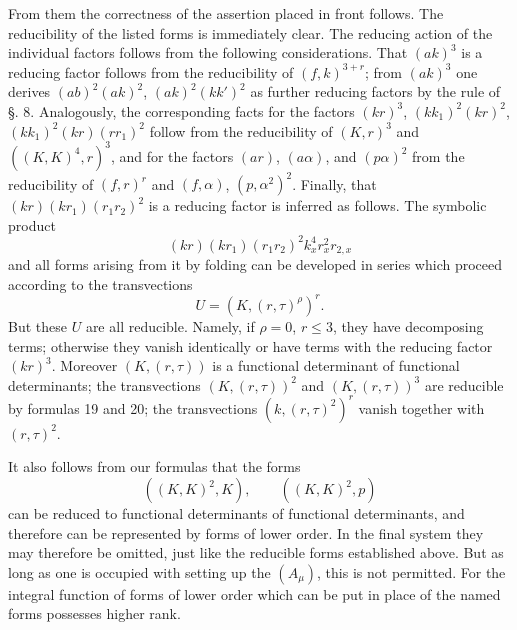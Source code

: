 \documentclass[10pt]{article}
\begin{document}
From them the correctness of the assertion placed in front follows. The reducibility of the listed forms is immediately clear. The reducing action of the individual factors follows from the following considerations. That $(ak)^3$ is a reducing factor follows from the reducibility of $(f,k)^{3+r}$; from $(ak)^3$ one derives $(ab)^2(ak)^2$, $(ak)^2(kk')^2$ as further reducing factors by the rule of §. 8. Analogously, the corresponding facts for the factors $(kr)^3$, $(kk_1)^2(kr)^2$, $(kk_1)^2(kr)(rr_1)^2$ follow from the reducibility of $(K,r)^3$ and $((K,K)^4,r)^3$, and for the factors $(ar)$, $(a\alpha)$, and $(p\alpha)^2$ from the reducibility of $(f,r)^r$ and $(f,\alpha)$, $(p,\alpha^2)^2$. Finally, that $(kr)(kr_1)(r_1r_2)^2$ is a reducing factor is inferred as follows. The symbolic product
\[
(kr)(kr_1)(r_1r_2)^2k_x^4r_x^2r_{2,x}
\]
and all forms arising from it by folding can be developed in series which proceed according to the transvections
\[
U=(K,(r,\tau)^\rho)^r.
\]
But these $U$ are all reducible. Namely, if $\rho=0$, $r\leq3$, they have decomposing terms; otherwise they vanish identically or have terms with the reducing factor $(kr)^3$. Moreover $(K,(r,\tau))$ is a functional determinant of functional determinants; the transvections $(K,(r,\tau))^2$ and $(K,(r,\tau))^3$ are reducible by formulas 19 and 20; the transvections $(k,(r,\tau)^2)^r$ vanish together with $(r,\tau)^2$.

It also follows from our formulas that the forms
\[
((K,K)^2,K),
\qquad ((K,K)^2,p)
\]
can be reduced to functional determinants of functional determinants, and therefore can be represented by forms of lower order. In the final system they may therefore be omitted, just like the reducible forms established above. But as long as one is occupied with setting up the $(A_\mu)$, this is not permitted. For the integral function of forms of lower order which can be put in place of the named forms possesses higher rank.
\end{document}
